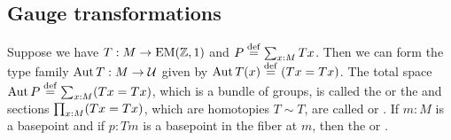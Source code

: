 \subsection{Gauge transformations}
\begin{mydef}
\label{sec:automorphisms}
Suppose we have \( T:M\to\mathrm{EM}(\mathbb{Z},1) \) and \( P\stackrel{\mathrm{def}}{=}\sum_{x:M}Tx \). Then we can form the type family \( \operatorname{Aut} T:M\to\mathcal{U} \) given by \( \operatorname{Aut} T(x)\stackrel{\mathrm{def}}{=}(Tx=Tx) \). The total space \( \operatorname{Aut} P\stackrel{\mathrm{def}}{=}\sum_{x:M}(Tx=Tx) \), which is a bundle of groups, is called the  or the  and sections \( \prod_{x:M}(Tx=Tx) \), which are homotopies \( T\sim T \), are called  or . If \( m:M \) is a basepoint and if \( p:Tm \) is a basepoint in the fiber at \( m \), then the  or .
\end{mydef}
